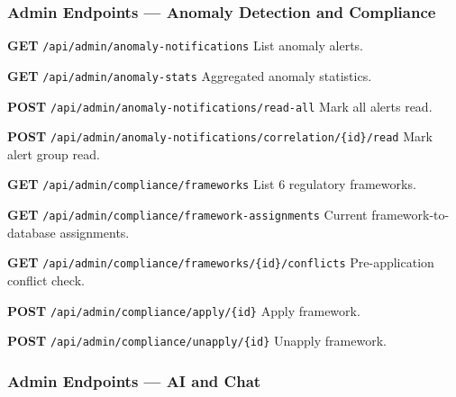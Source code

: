 \subsubsection{Admin Endpoints — Anomaly Detection and Compliance}

\begin{tcolorbox}[colback=orange!5, colframe=orange!50, title=\textbf{Anomaly and Compliance Endpoints}]

\textbf{GET} \texttt{/api/admin/anomaly-notifications} \quad List anomaly alerts.

\vspace{0.2cm}

\textbf{GET} \texttt{/api/admin/anomaly-stats} \quad Aggregated anomaly statistics.

\vspace{0.2cm}

\textbf{POST} \texttt{/api/admin/anomaly-notifications/read-all} \quad Mark all alerts read.

\vspace{0.2cm}

\textbf{POST} \texttt{/api/admin/anomaly-notifications/correlation/\{id\}/read} \quad Mark alert group read.

\vspace{0.2cm}

\textbf{GET} \texttt{/api/admin/compliance/frameworks} \quad List 6 regulatory frameworks.

\vspace{0.2cm}

\textbf{GET} \texttt{/api/admin/compliance/framework-assignments} \quad Current framework-to-database assignments.

\vspace{0.2cm}

\textbf{GET} \texttt{/api/admin/compliance/frameworks/\{id\}/conflicts} \quad Pre-application conflict check.

\vspace{0.2cm}

\textbf{POST} \texttt{/api/admin/compliance/apply/\{id\}} \quad Apply framework.

\vspace{0.2cm}

\textbf{POST} \texttt{/api/admin/compliance/unapply/\{id\}} \quad Unapply framework.

\end{tcolorbox}

\subsubsection{Admin Endpoints — AI and Chat}

